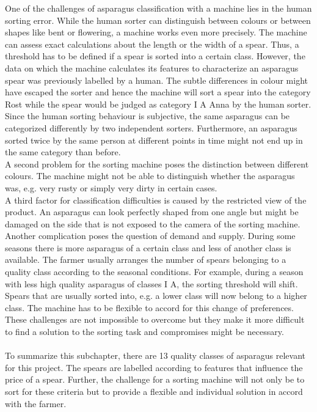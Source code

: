 One of the challenges of asparagus classification with a machine lies in the human sorting error. While the human sorter can distinguish between colours or between shapes like bent or flowering, a machine works even more precisely. The machine can assess exact calculations about the length or the width of a spear. Thus, a threshold has to be defined if a spear is sorted into a certain class. However, the data on which the machine calculates its features to characterize an asparagus spear was previously labelled by a human. The subtle differences in colour might have escaped the sorter and hence the machine will sort a spear into the category Rost while the spear would be judged as category I A Anna by the human sorter. Since the human sorting behaviour is subjective, the same asparagus can be categorized differently by two independent sorters. Furthermore, an asparagus sorted twice by the same person at different points in time might not end up in the same category than before. \\
A second problem for the sorting machine poses the distinction between different colours. The machine might not be able to distinguish whether the asparagus was, e.g. very rusty or simply very dirty in certain cases. \\
A third factor for classification difficulties is caused by the restricted view of the product. An asparagus can look perfectly shaped from one angle but might be damaged on the side that is not exposed to the camera of the sorting machine. \\
Another complication poses the question of demand and supply. During some seasons there is more asparagus of a certain class and less of another class is available. The farmer usually arranges the number of spears belonging to a quality class according to the seasonal conditions. For example, during a season with less high quality asparagus of classes I A, the sorting threshold will shift. Spears that are usually sorted into, e.g. a lower class will now belong to a higher class. The machine has to be flexible to accord for this change of preferences. \\
These challenges are not impossible to overcome but they make it more difficult to find a solution to the sorting task and compromises might be necessary. \\
\\
To summarize this subchapter, there are 13 quality classes of asparagus relevant for this project. The spears are labelled according to features that influence the price of a spear. Further, the challenge for a sorting machine will not only be to sort for these criteria but to provide a flexible and individual solution in accord with the farmer.


